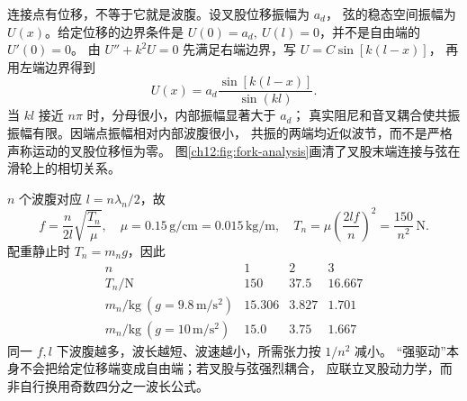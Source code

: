 \begin{xesolution}
连接点有位移，不等于它就是波腹。设叉股位移振幅为 $a_d$，
弦的稳态空间振幅为 $U(x)$。给定位移的边界条件是
$U(0)=a_d,\ U(l)=0$，并不是自由端的 $U'(0)=0$。
由 $U''+k^2U=0$ 先满足右端边界，写 $U=C\sin[k(l-x)]$，
再用左端边界得到
\[
 U(x)=a_d\frac{\sin[k(l-x)]}{\sin(kl)}.
\]
当 $kl$ 接近 $n\pi$ 时，分母很小，内部振幅显著大于 $a_d$；
真实阻尼和音叉耦合使共振振幅有限。因端点振幅相对内部波腹很小，
共振的两端均近似波节，而不是严格声称运动的叉股位移恒为零。
图\ref{ch12:fig:fork-analysis}画清了叉股末端连接与弦在滑轮上的相切关系。

\begin{center}\begin{minipage}{\linewidth}\centering
{}
\label{ch12:fig:fork-analysis}
\end{minipage}\end{center}

$n$ 个波腹对应 $l=n\lambda_n/2$，故
\[
 f=\frac{n}{2l}\sqrt{\frac{T_n}{\mu}},\quad
 \mu=0.15\,\mathrm{g/cm}=0.015\,\mathrm{kg/m},\quad
 T_n=\mu\left(\frac{2lf}{n}\right)^2=\frac{150}{n^2}\,\mathrm N.
\]
配重静止时 $T_n=m_ng$，因此
\[
\begin{array}{c|ccc}
 n&1&2&3\\ \hline
 T_n/\mathrm N&150&37.5&16.667\\
 m_n/\mathrm{kg}\ (g=9.8\,\mathrm{m/s^2})&15.306&3.827&1.701\\
 m_n/\mathrm{kg}\ (g=10\,\mathrm{m/s^2})&15.0&3.75&1.667
\end{array}
\]
同一 $f,l$ 下波腹越多，波长越短、波速越小，所需张力按 $1/n^2$ 减小。
“强驱动”本身不会把给定位移端变成自由端；若叉股与弦强烈耦合，
应联立叉股动力学，而非自行换用奇数四分之一波长公式。
\end{xesolution}

